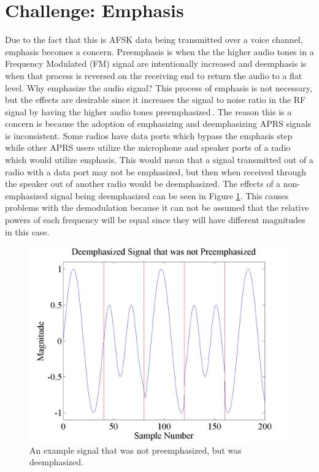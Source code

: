\section{Challenge: Emphasis}
Due to the fact that this is AFSK data being transmitted over a voice channel, emphasis becomes a concern. Preemphasis is when the the higher audio tones in a Frequency Modulated (FM) signal are intentionally increased and deemphasis is when that process is reversed on the receiving end to return the audio to a flat level. Why emphasize the audio signal? This process of emphasis is not necessary, but the effects are desirable since it increases the signal to noise ratio in the RF signal by having the higher audio tones preemphasized\,\cite{Gibilisco1994}. The reason this is a concern is because the adoption of emphasizing and deemphasizing APRS signals is inconsistent. Some radios have data ports which bypass the emphasis step while other APRS users utilize the microphone and speaker ports of a radio which would utilize emphasis. This would mean that a signal transmitted out of a radio with a data port may not be emphasized, but then when received through the speaker out of another radio would be deemphasized. The effects of a non-emphasized signal being deemphasized can be seen in Figure \ref{emphasisExample}. This causes problems with the demodulation because it can not be assumed that the relative powers of each frequency will be equal since they will have different magnitudes in this case. 
\begin{figure}
  \centering
	\includegraphics[width=0.75\linewidth]{images/DeemphasizedSignalthatwasnotPreemphasized.png} 
	\caption{An example signal that was not preemphasized, but was deemphasized.}
   \label{emphasisExample}
\end{figure}
